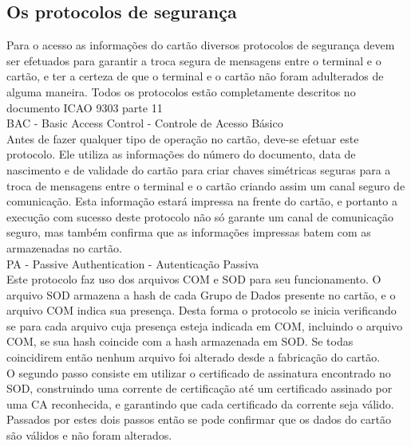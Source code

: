\documentclass{article}
\begin{document}
	\subsection{Os protocolos de segurança}
		\begin{justify}
			\hspace{2cm}Para o acesso as informações do cartão diversos protocolos de segurança devem ser efetuados para garantir a troca segura de mensagens entre o terminal e o cartão, e ter a certeza de que o terminal e o cartão não foram adulterados de alguma maneira. Todos os protocolos estão completamente descritos no documento ICAO 9303 parte 11\\

			\hspace*{2cm} BAC - Basic Access Control - Controle de Acesso Básico\\
			\hspace*{2cm} Antes de fazer qualquer tipo de operação no cartão, deve-se efetuar este protocolo. Ele utiliza as informações do número do documento, data de nascimento e de validade do cartão para criar chaves simétricas seguras para a troca de mensagens entre o terminal e o cartão criando assim um canal seguro de comunicação. Esta informação estará impressa na frente do cartão, e portanto a execução com sucesso deste protocolo não só garante um canal de comunicação seguro, mas também confirma que as informações impressas batem com as armazenadas no cartão.\\
			
			\hspace*{2cm} PA - Passive Authentication - Autenticação Passiva\\
			\hspace*{2cm} Este protocolo faz uso dos arquivos COM e SOD para seu funcionamento. O arquivo SOD armazena a hash de cada Grupo de Dados presente no cartão, e o arquivo COM indica sua presença. Desta forma o protocolo se inicia verificando se para cada arquivo cuja presença esteja indicada em COM, incluindo o arquivo COM, se sua hash coincide com a hash armazenada em SOD. Se todas coincidirem então nenhum arquivo foi alterado desde a fabricação do cartão.\\
			\hspace*{2cm} O segundo passo consiste em utilizar o certificado de assinatura encontrado no SOD, construindo uma corrente de certificação até um certificado assinado por uma CA reconhecida, e garantindo que cada certificado da corrente seja válido. Passados por estes dois passos então se pode confirmar que os dados do cartão são válidos e não foram alterados.\\
			

\end{justify}
\end{document}
